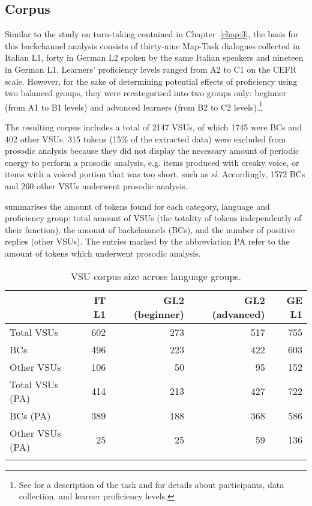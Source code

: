 \subsection{Corpus}
\label{sec:4.2.1}
Similar to the study on turn-taking contained in Chapter~\ref{chap:3}, the basis for this backchannel analysis consists of thirty-nine Map-Task dialogues collected in Italian L1, forty in German L2 spoken by the same Italian speakers and nineteen in German L1. Learners’ proficiency levels ranged from A2 to C1 on the CEFR scale. However, for the sake of determining potential effects of proficiency using two balanced groups, they were recategorised into two groups only: beginner (from A1 to B1 levels) and advanced learners (from B2 to C2 levels).\footnote{See  for a description of the task and  for details about participants, data collection, and learner proficiency levels.}

The resulting corpus includes a total of 2147 VSUs, of which 1745 were BCs and 402 other VSUs. 315 tokens (15\% of the extracted data) were excluded from prosodic analysis because they did not display the necessary amount of periodic energy to perform a prosodic analysis, e.g. items produced with creaky voice, or items with a voiced portion that was too short, such as \textit{sì}. Accordingly, 1572 BCs and 260 other VSUs underwent prosodic analysis. 

 summarises the amount of tokens found for each category, language and proficiency group: total amount of VSUs (the totality of tokens independently of their function), the amount of backchannels (BCs), and the number of positive replies (other VSUs). The entries marked by the abbreviation PA refer to the amount of tokens which underwent prosodic analysis.

\begin{table}
\begin{tabular}{lrrrr}
\lsptoprule
 & IT L1 & GL2 (beginner) & GL2 (advanced) & GE L1\\
 \midrule
Total VSUs & 602 & 273 & 517 & 755\\
BCs & 496 & 223 & 422 & 603\\
Other VSUs & 106 & 50 & 95 & 152\\
Total VSUs (PA) & 414 & 213 & 427 & 722\\
BCs (PA) & 389 & 188 & 368 & 586\\
Other VSUs (PA) & 25 & 25 & 59 & 136\\
\lspbottomrule
\end{tabular}
\caption{VSU corpus size across language groups.}
\label{tab:4.1}
\end{table}

